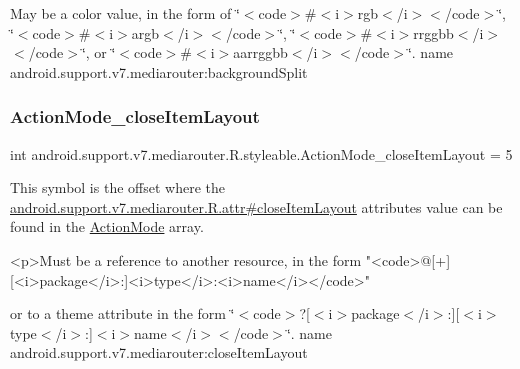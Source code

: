 May be a color value, in the form of \char`\"{}$<$code$>$\#$<$i$>$rgb$<$/i$>$$<$/code$>$\char`\"{}, \char`\"{}$<$code$>$\#$<$i$>$argb$<$/i$>$$<$/code$>$\char`\"{}, \char`\"{}$<$code$>$\#$<$i$>$rrggbb$<$/i$>$$<$/code$>$\char`\"{}, or \char`\"{}$<$code$>$\#$<$i$>$aarrggbb$<$/i$>$$<$/code$>$\char`\"{}.  name android.\+support.\+v7.\+mediarouter\+:background\+Split \mbox{\label{classandroid_1_1support_1_1v7_1_1mediarouter_1_1R_1_1styleable_a544a453f2ea1703ee087d75cc3da448d}} 
\subsubsection{\texorpdfstring{Action\+Mode\+\_\+close\+Item\+Layout}{ActionMode\_closeItemLayout}}
{\footnotesize\ttfamily int android.\+support.\+v7.\+mediarouter.\+R.\+styleable.\+Action\+Mode\+\_\+close\+Item\+Layout = 5\hspace{0.3cm}{\ttfamily [static]}}

This symbol is the offset where the \hyperlink{classandroid_1_1support_1_1v7_1_1mediarouter_1_1R_1_1attr_aff5cf12989d6d01a668c3b60293a0e02}{android.\+support.\+v7.\+mediarouter.\+R.\+attr\#close\+Item\+Layout} attribute\textquotesingle{}s value can be found in the \hyperlink{classandroid_1_1support_1_1v7_1_1mediarouter_1_1R_1_1styleable_a4aa490e6088a98056876d4f9227193c8}{Action\+Mode} array.

\begin{DoxyVerb}      <p>Must be a reference to another resource, in the form "<code>@[+][<i>package</i>:]<i>type</i>:<i>name</i></code>"
\end{DoxyVerb}
 or to a theme attribute in the form \char`\"{}$<$code$>$?\mbox{[}$<$i$>$package$<$/i$>$\+:\mbox{]}\mbox{[}$<$i$>$type$<$/i$>$\+:\mbox{]}$<$i$>$name$<$/i$>$$<$/code$>$\char`\"{}.  name android.\+support.\+v7.\+mediarouter\+:close\+Item\+Layout \mbox{\label{classandroid_1_1support_1_1v7_1_1mediarouter_1_1R_1_1styleable_a6b8d66b42ebc726d21097cf62e090d8a}} 
